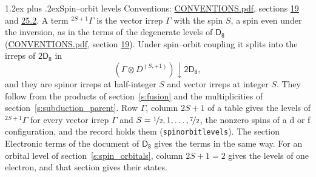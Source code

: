 \documentclass[10pt,a4paper]{article}
\makeatletter
\renewcommand\section{\@startsection{section}{1}{\z@}{-3ex plus -1ex minus -.2ex}%
  {1.2ex plus .2ex}{\normalfont\large\sffamily\bfseries\color{parttitle}}}
\numberwithin{equation}{section}
\newcommand{\grp}[1]{\mathsf{#1}}
\newcommand{\restr}[2]{#1\!\downarrow#2}
\newcommand{\irrJp}[2]{D^{(#1,#2)}}
\newcommand{\irrprod}{\otimes}
\newcommand{\term}[2]{{}^{#1}#2}
\makeatother
\begin{document}
\section{Spin--orbit levels}\label{s:spin_orbit}
Conventions: \href{../../CONVENTIONS.pdf}{CONVENTIONS.pdf}, sections \href{../../../rotation/CONVENTIONS.pdf\#conv.19}{19} and \href{../../CONVENTIONS.pdf\#conv.25.2}{25.2}.
\leavevmode\label{n:local.spin}\label{n:symbol.term}A term $\term{2S+1}{\Gamma}$ is the vector irrep $\Gamma$ with the spin $S$, a spin even under the inversion, as in the terms of the degenerate levels of \href{../../../rotation/data/pdf/D8.pdf}{$\grp{D_{8}}$} (\href{../../CONVENTIONS.pdf}{CONVENTIONS.pdf}, section \href{../../../rotation/CONVENTIONS.pdf\#conv.19}{19}). Under spin--orbit coupling it splits into the irreps of $\grp{2D_{8}}$ in
\begin{equation}\label{e:spinorbit}\restr{(\Gamma \irrprod \irrJp{S}{+1})}{\grp{2D_{8}}},\end{equation}
and they are spinor irreps at half-integer $S$ and vector irreps at integer $S$. They follow from the products of section~\ref{s:fusion} and the multiplicities of section~\ref{s:subduction_parent}. Row $\Gamma$, column $2S + 1$ of a table gives the levels of $\term{2S+1}{\Gamma}$ for every vector irrep $\Gamma$ and $S = \nicefrac{1}{2}, 1, \dots, \nicefrac{7}{2}$, the nonzero spins of a d or f configuration, and the record holds them (\texttt{spinorbitlevels}). The section Electronic terms of the document of \href{../../../rotation/data/pdf/D8.pdf}{$\grp{D_{8}}$} gives the terms in the same way. For an orbital level of section~\ref{s:spin_orbitals}, column $2S + 1 = 2$ gives the levels of one electron, and that section gives their states.
\end{document}
